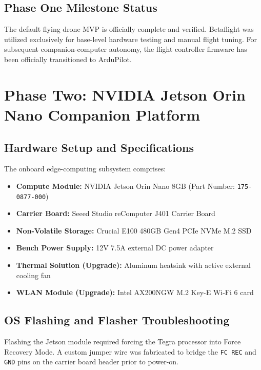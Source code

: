 \documentclass[11pt,a4paper]{article}
\begin{document}
\subsection{Phase One Milestone Status} 
The default flying drone MVP is officially complete and verified. Betaflight was utilized exclusively for base-level hardware testing and manual flight tuning. For subsequent companion-computer autonomy, the flight controller firmware has been officially transitioned to ArduPilot.

\newpage
\section{Phase Two: NVIDIA Jetson Orin Nano Companion Platform} 

\subsection{Hardware Setup and Specifications} 
The onboard edge-computing subsystem comprises: 
\begin{itemize}
    \item \textbf{Compute Module:} NVIDIA Jetson Orin Nano 8GB (Part Number: \texttt{175-0877-000}) 
    \item \textbf{Carrier Board:} Seeed Studio reComputer J401 Carrier Board 
    \item \textbf{Non-Volatile Storage:} Crucial E100 480GB Gen4 PCIe NVMe M.2 SSD 
    \item \textbf{Bench Power Supply:} 12V 7.5A external DC power adapter 
    \item \textbf{Thermal Solution (Upgrade):} Aluminum heatsink with active external cooling fan 
    \item \textbf{WLAN Module (Upgrade):} Intel AX200NGW M.2 Key-E Wi-Fi 6 card 
\end{itemize}

\subsection{OS Flashing and Flasher Troubleshooting} 
Flashing the Jetson module required forcing the Tegra processor into Force Recovery Mode. A custom jumper wire was fabricated to bridge the \texttt{FC REC} and \texttt{GND} pins on the carrier board header prior to power-on. 
\end{document}
